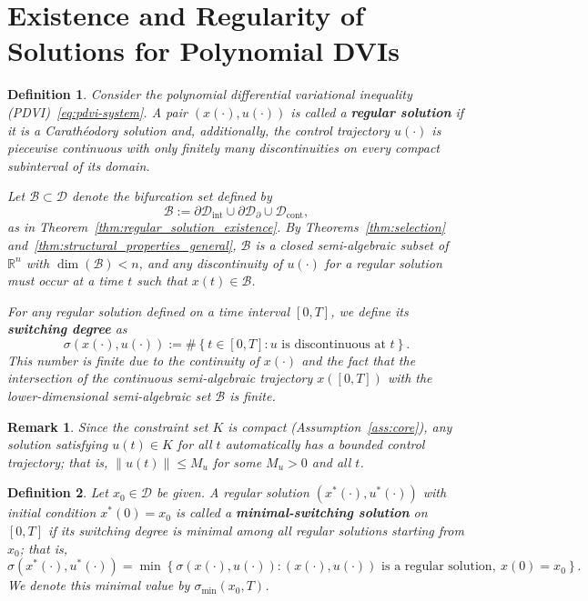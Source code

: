 \documentclass[sn-basic,Numbered]{sn-jnl}
\theoremstyle{thmstyleone}%
\newtheorem{definition}{Definition}%
\newtheorem{remark}{Remark}%
\begin{document}
\section{Existence and Regularity of Solutions for Polynomial DVIs}\label{Existence}

\begin{definition}\label{def:switching_degree}
Consider the polynomial differential variational inequality (PDVI)~\eqref{eq:pdvi-system}. 
A pair $(x(\cdot), u(\cdot))$ is called a \textbf{regular solution} if it is a Carath\'{e}odory solution and, additionally, the control trajectory $u(\cdot)$ is piecewise continuous with only finitely many discontinuities on every compact subinterval of its domain.

Let $\mathcal{B} \subset \mathcal{D}$ denote the bifurcation set defined by
\[
\mathcal{B} := \partial \mathcal{D}_{\mathrm{int}} \cup \partial \mathcal{D}_{\partial} \cup \mathcal{D}_{\mathrm{cont}},
\]
as in Theorem~\ref{thm:regular_solution_existence}. By Theorems~\ref{thm:selection} and~\ref{thm:structural_properties_general}, $\mathcal{B}$ is a closed semi-algebraic subset of $\mathbb{R}^n$ with $\dim(\mathcal{B}) < n$, and any discontinuity of $u(\cdot)$ for a regular solution must occur at a time $t$ such that $x(t) \in \mathcal{B}$.

For any regular solution defined on a time interval $[0, T]$, we define its \textbf{switching degree} as
\[
 \sigma(x(\cdot), u(\cdot)) := \# \left\{ t \in [0,T] : u \text{ is discontinuous at } t \right\}.
\]
This number is finite due to the continuity of $x(\cdot)$ and the fact that the intersection of the continuous semi-algebraic trajectory $x([0,T])$ with the lower-dimensional semi-algebraic set $\mathcal{B}$ is finite.
\end{definition}

\begin{remark}
Since the constraint set $K$ is compact (Assumption~\ref{ass:core}), any solution satisfying $u(t) \in K$ for all $t$ automatically has a bounded control trajectory; that is, $\|u(t)\| \leq M_u$ for some $M_u > 0$ and all $t$.
\end{remark}

\begin{definition}\label{def:minimal_switching}
Let $x_0 \in \mathcal{D}$ be given. A regular solution $(x^*(\cdot), u^*(\cdot))$ with initial condition $x^*(0) = x_0$ is called a \textbf{minimal-switching solution} on $[0, T]$ if its switching degree is minimal among all regular solutions starting from $x_0$; that is,
\[
 \sigma(x^*(\cdot), u^*(\cdot)) = \min \left\{ \sigma(x(\cdot), u(\cdot)) : (x(\cdot), u(\cdot)) \text{ is a regular solution},\ x(0) = x_0 \right\}.
\]
We denote this minimal value by $\sigma_{\min}(x_0, T)$.
\end{definition}
\end{document}
